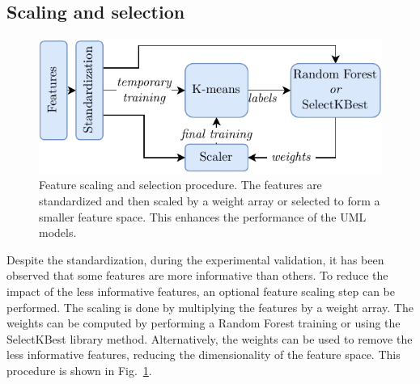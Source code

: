 \subsection{Scaling and selection}
\begin{figure}
    \includegraphics[width=\linewidth]{images/Feat_scaling.pdf}
    \caption{Feature scaling and selection procedure. The features are standardized and then scaled by a weight array or selected to form a smaller feature space. This enhances the performance of the UML models.}
    \label{fig:feature_scaling}
\end{figure}
Despite the standardization, during the experimental validation, it has been observed that some features are more informative than others. To reduce the impact of the less informative features, an optional feature scaling step can be performed. The scaling is done by multiplying the features by a weight array. The weights can be computed by performing a Random Forest training or using the SelectKBest library method. Alternatively, the weights can be used to remove the less informative features, reducing the dimensionality of the feature space. This procedure is shown in Fig.~\ref{fig:feature_scaling}.